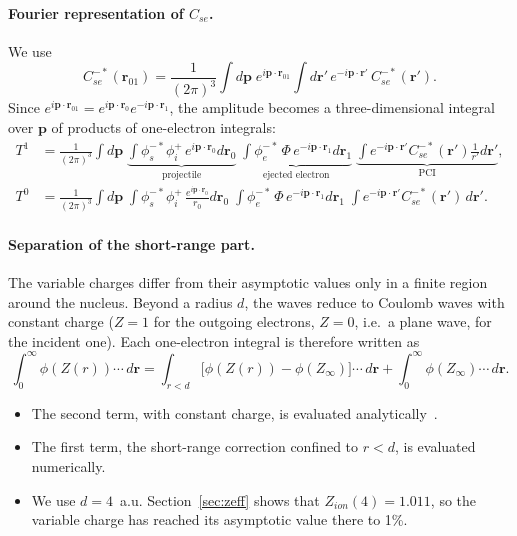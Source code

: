 \documentclass[11pt,a4paper]{article}
\newcommand{\br}{\mathbf r}
\newcommand{\bp}{\mathbf p}
\begin{document}
\paragraph{Fourier representation of $C_{se}$.} We use
\begin{equation}
C^{-*}_{se}(\br_{01})=\frac1{(2\pi)^{3}}\int d\bp\;e^{i\bp\cdot\br_{01}}
\int d\br'\,e^{-i\bp\cdot\br'}\,C^{-*}_{se}(\br').
\end{equation}
Since $e^{i\bp\cdot\br_{01}}=e^{i\bp\cdot\br_0}e^{-i\bp\cdot\br_1}$, the amplitude becomes a
three-dimensional integral over $\bp$ of products of one-electron integrals:
\begin{align}
T^1&=\frac1{(2\pi)^3}\int d\bp\;
\underbrace{\int\phi^{-*}_s\phi^+_i\,e^{i\bp\cdot\br_0}d\br_0}_{\text{projectile}}\;
\underbrace{\int\phi^{-*}_e\,\Phi\,e^{-i\bp\cdot\br_1}d\br_1}_{\text{ejected electron}}\;
\underbrace{\int e^{-i\bp\cdot\br'}C^{-*}_{se}(\br')\frac{1}{r'}d\br'}_{\text{PCI}},\\
T^0&=\frac1{(2\pi)^3}\int d\bp\;
\int\phi^{-*}_s\phi^+_i\,\frac{e^{i\bp\cdot\br_0}}{r_0}d\br_0\;
\int\phi^{-*}_e\,\Phi\,e^{-i\bp\cdot\br_1}d\br_1\;
\int e^{-i\bp\cdot\br'}C^{-*}_{se}(\br')\,d\br'.
\end{align}

\paragraph{Separation of the short-range part.} The variable charges differ from their asymptotic
values only in a finite region around the nucleus. Beyond a radius $d$, the waves reduce to
Coulomb waves with constant charge ($Z=1$ for the outgoing electrons, $Z=0$, i.e.\ a plane wave,
for the incident one). Each one-electron integral is therefore written as
\begin{equation}
\int_0^\infty\phi(Z(r))\cdots\,d\br=\int_{r<d}\big[\phi(Z(r))-\phi(Z_\infty)\big]\cdots\,d\br
+\int_0^\infty\phi(Z_\infty)\cdots\,d\br .
\label{eq:split}
\end{equation}
\begin{itemize}
\item The second term, with constant charge, is evaluated analytically~\cite{DalCappello1984,Brothers1984}.
\item The first term, the short-range correction confined to $r<d$, is evaluated numerically.
\item We use $d=4$~a.u. Section~\ref{sec:zeff} shows that $Z_{ion}(4)=1.011$, so the variable
  charge has reached its asymptotic value there to 1\%.
\end{itemize}
\end{document}
